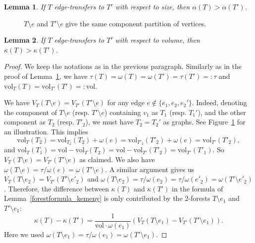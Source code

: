 \documentclass[10pt,a4paper]{amsart}
\newtheorem{lemma}{Lemma}
\newcommand{\vol}{\text{vol}}
\begin{document}
\begin{lemma}\label{inequality_aht}
If $T$ edge-transfers to $T'$ with respect to size, then $\alpha(T)>\alpha(T')$.
\end{lemma}

\begin{figure}[ht]
    \centering
    
    \caption{$T\setminus e$ and $T'\setminus e$ give the same component partition of vertices.}
    \label{fig:proof}
\end{figure}

\begin{lemma}\label{inequality_kemeny}
If $T$ edge-transfers to $T'$ with respect to volume, then $\kappa(T)>\kappa(T')$.
\end{lemma}

\begin{proof}
We keep the notations as in the previous paragraph. Similarly as in the proof of Lemma~\ref{inequality_aht}, we have $\tau(T)=\omega(T)=\omega(T')=\tau(T')=:\tau$ and $\vol_T(T)=\vol_{T'}(T')=:\vol$.

We have $V_T(T\setminus e)=V_{T'}(T'\setminus e)$ for any edge $e\not\in \{e_1,e_2,e_2'\}$. Indeed, denoting the component of $T\setminus e$ (resp. $T'\setminus e$) containing $v_1$ as $T_1$ (resp. $T_1'$), and the other component as $T_2$ (resp. $T'_2$), we must have $T_2=T_2'$ as graphs. See Figure~\ref{fig:proof} for an illustration. This implies
    \[\vol_{T}(T_2)=\vol_{T_2}(T_2)+\omega(e)=\vol_{T'_2}(T'_2)+\omega(e)=\vol_{T'}(T'_2),\]
and $\vol_{T}(T_1)=\vol -\vol_{T}(T_2)=\vol -\vol_{T'}(T'_2)=\vol_{T'}(T'_1)$. So $V_T(T\setminus e)=V_{T'}(T'\setminus e)$ as claimed. We also have $\omega(T\setminus e)=\tau/\omega(e)=\omega(T'\setminus e)$. A similar argument gives us $V_T(T\setminus e_2)=V_{T'}(T'\setminus e'_2)$ and $\omega(T\setminus e_2)=\tau/\omega(e_2)=\tau/\omega(e'_2)=\omega(T'\setminus e'_2)$. Therefore, the difference between $\kappa(T)$ and $\kappa(T')$ in the formula of Lemma~\ref{forestformula_kemeny} is only contributed by the $2$-forests $T\setminus e_1$ and $T'\setminus e_1$:\begin{equation}\label{eq:inequality_kemeny_1}
    \kappa(T)-\kappa(T')=\frac{1}{\vol \cdot \omega(e_1)}(V_T(T\setminus e_1)-V_{T'}(T'\setminus e_1)).
\end{equation} Here we used $\omega(T\setminus e_1)=\tau/\omega(e_1)=\omega(T'\setminus e_1)$.


\end{proof}
\end{document}
